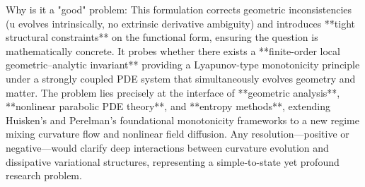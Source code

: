 Why is it a "good" problem:  
This formulation corrects geometric inconsistencies (u evolves intrinsically, no extrinsic derivative ambiguity) and introduces **tight structural constraints** on the functional form, ensuring the question is mathematically concrete. It probes whether there exists a **finite-order local geometric–analytic invariant** providing a Lyapunov-type monotonicity principle under a strongly coupled PDE system that simultaneously evolves geometry and matter. The problem lies precisely at the interface of **geometric analysis**, **nonlinear parabolic PDE theory**, and **entropy methods**, extending Huisken’s and Perelman’s foundational monotonicity frameworks to a new regime mixing curvature flow and nonlinear field diffusion. Any resolution—positive or negative—would clarify deep interactions between curvature evolution and dissipative variational structures, representing a simple-to-state yet profound research problem.